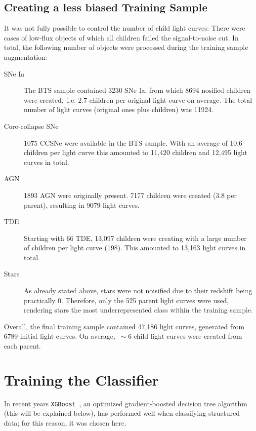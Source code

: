 \subsection{Creating a less biased Training Sample}
It was not fully possible to control the number of child light curves: There were cases of low-flux objects of which all children failed the signal-to-noise cut. In total, the following number of objects were processed during the training sample augmentation:
\begin{description}
  \item[SNe Ia] The BTS sample contained 3230 SNe Ia, from which 8694 nosified children were created,~i.e. 2.7 children per original light curve on average. The total number of light curves (original ones plus children) was 11924.
  \item[Core-collapse SNe] 1075 CCSNe were available in the BTS sample. With an average of 10.6 children per light curve this amounted to 11,420 children and 12,495 light curves in total.
  \item[AGN] 1893 AGN were originally present. 7177 children were created (3.8 per parent), resulting in 9079 light curves.
  \item[TDE] Starting with 66 TDE, 13,097 children were creating with a large number of children per light curve (198). This amounted to 13,163 light curves in total.
  \item[Stars] As already stated above, stars were not noisified due to their redshift being practically 0. Therefore, only the 525 parent light curves were used, rendering stars the most underrepresented class within the training sample.
\end{description}
Overall, the final training sample contained 47,186 light curves, generated from 6789 initial light curves. On average, $~\sim 6$ child light curves were created from each parent.

\section{Training the Classifier}
In recent years \texttt{XGBoost}~, an optimized gradient-boosted decision tree algorithm (this will be explained below), has performed well when classifying structured data; for this reason, it was chosen here.

